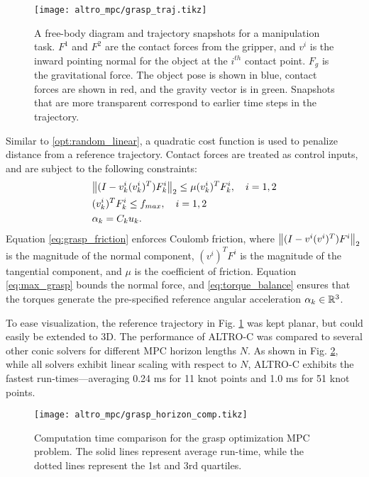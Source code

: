 \documentclass[../root.tex]{subfiles}
\begin{document}
\begin{figure}[btp]
    \centering
    \texttt{[image: altro\_mpc/grasp\_traj.tikz]}
    \caption{A free-body diagram and trajectory snapshots for a manipulation
    task. $F^1$ and $F^2$ are the contact forces from the gripper, and $v^i$
    is the inward pointing normal for the object at the $i^{th}$ contact
    point. $F_g$ is the gravitational force. The object pose is shown in
    blue, contact forces are shown in red, and the gravity vector is in
    green. Snapshots that are more transparent correspond to earlier time
    steps in the trajectory.}
    \label{fig:grasp_fbd_traj}
\end{figure}

Similar to \eqref{opt:random_linear}, a quadratic cost function is used to
penalize distance from a reference trajectory. Contact forces are treated as
control inputs, and are subject to the following constraints:
\begin{subequations}
\begin{align}
    &\norm{(I-v_k ^i(v_k ^i)^T) F_k^i}_2\leq \mu (v_k ^i) ^T F_k^i, \quad i = 1,2 \label{eq:grasp_friction} \\
    &(v_k ^i) ^T F_k^i \leq f_{max}, \quad i = 1,2 \label{eq:max_grasp} \\
    &\alpha_k = C_k u_k. \label{eq:torque_balance}
\end{align}
\end{subequations}
Equation \eqref{eq:grasp_friction} enforces Coulomb friction, where
$\norm{(I-v^i (v^i) ^T) F^i}_2$ is the magnitude of the normal component,
$(v^i) ^T F^i$ is the magnitude of the tangential component, and $\mu$ is the
coefficient of friction. Equation \eqref{eq:max_grasp} bounds the normal
force, and \eqref{eq:torque_balance} ensures that the torques generate the
pre-specified reference angular acceleration $\alpha_k \in \mathbb{R}^{3}$.

To ease visualization, the reference trajectory in Fig.
\ref{fig:grasp_fbd_traj} was kept planar, but could easily be extended to 3D.
The performance of ALTRO-C was compared to several other conic solvers for
different MPC horizon lengths $N$. As shown in Fig. \ref{fig:grasp}, while
all solvers exhibit linear scaling with respect to $N$, ALTRO-C exhibits the
fastest run-times---averaging 0.24 ms for 11 knot points and 1.0 ms for 51
knot points.

\begin{figure}[btp]
    \centering
    \texttt{[image: altro\_mpc/grasp\_horizon\_comp.tikz]}
    \caption{Computation time comparison for the grasp optimization MPC
    problem. The solid lines represent average run-time, while the dotted
    lines represent the 1st and 3rd quartiles.}
    \label{fig:grasp}
\end{figure}
\end{document}
